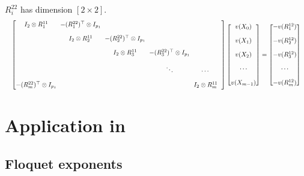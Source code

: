 \documentclass[mathserif, handout]{beamer}
\begin{document}
\begin{frame}[allowframebreaks]
\begin{itemize}
       $R^{22}_i$ has dimension $[2\!\times\! 2]$.
       \[
         \resizebox{\linewidth}{!}{%
           $
           \setlength{\arraycolsep}{3pt}
           \begin{bmatrix}
             I_{2}\otimes R^{11}_{1} & -(R^{22}_{1})^\top \otimes I_{p_{1}} &  & \\[1em]
             & I_{2}\otimes R^{11}_{2} & -(R^{22}_{2})^\top  \otimes I_{p_{1}} &  &\\[1em]
             &  & I_{2}\otimes R^{11}_{3} & -(R^{22}_{3})^\top \otimes I_{p_{1}} &  &\\[1em]
             & & & \ddots &\cdots & \\[1em]
             -(R^{22}_{m})^\top \otimes I_{p_{1}} & & & & I_{2}\otimes R^{11}_{m}
           \end{bmatrix}
           \begin{bmatrix}
             v(X_{0}) \\[1em]
             v(X_{1})  \\[1em]
             v(X_{2})  \\[1em]
             \cdots \\[1em]
             v(X_{m-1})
           \end{bmatrix}
           =
           \begin{bmatrix}
             -v(R^{12}_{1}) \\[1em]
             -v(R^{12}_{2}) \\[1em]
             -v(R^{12}_{3}) \\[1em]
             \cdots \\[1em]
             -v(R^{12}_{m})
           \end{bmatrix} $%
         }
  \]
  \end{itemize}

\end{frame}

\section{Application in \KSe }

\subsection{Floquet exponents}
\end{document}
